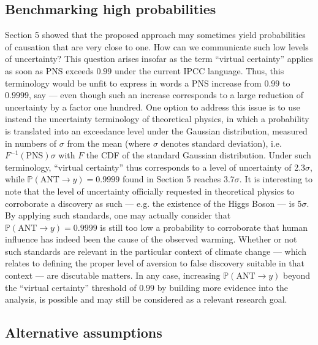 \documentclass[12pt]{article}
\newcommand{\PNS}{\textrm{PNS}}
\newcommand{\Proba}{\mathbb P}
\begin{document}
\subsection{Benchmarking high probabilities}
Section 5 showed that the proposed approach may sometimes yield probabilities of causation that are very close to one. How can we communicate such low levels of uncertainty? This question arises insofar as the term ``virtual certainty''  applies as soon as $\PNS$ exceeds $0.99$ under the current IPCC language. Thus, this terminology would be unfit to express in words a $\PNS$ increase from $0.99$ to $0.9999$, say --- even though such an increase corresponds to a large reduction of uncertainty by a factor one hundred. One option to address this issue is to use instead the uncertainty terminology of theoretical physics, in which a probability is translated into an exceedance level under the Gaussian distribution, measured in numbers of $\sigma$ from the mean (where $\sigma$ denotes standard deviation), i.e. $F^{-1}(\PNS)\sigma$ with $F$ the CDF of the standard Gaussian distribution. Under such terminology, ``virtual certainty'' thus corresponds to a level of uncertainty of 2.3$\sigma$, while $\Proba(\textrm{ANT}\rightarrow y)=0.9999$ found in Section 5 reaches 3.7$\sigma$. It is interesting to note that the level of uncertainty officially requested in theoretical physics to corroborate a discovery as such --- e.g. the existence of the Higgs Boson --- is 5$\sigma$. By applying such standards, one may actually consider that $\Proba(\textrm{ANT}\rightarrow y)=0.9999$ is still too low a probability to corroborate that human influence has indeed been the cause of the observed warming. Whether or not such standards are relevant in the particular context of climate change --- which relates to defining the proper level of aversion to false discovery suitable in that context --- are discutable matters. In any case, increasing $\Proba(\textrm{ANT}\rightarrow y)$ beyond the ``virtual certainty'' threshold of $0.99$ by building more evidence into the analysis, is possible and may still be considered as a relevant research goal.

\subsection{Alternative assumptions}
\end{document}
